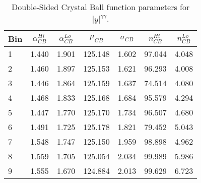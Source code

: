 \begin{table}[h]
\centering
\small
\caption{Double-Sided Crystal Ball function parameters for $|y|^{\gamma\gamma}$.}
\vspace{0.4cm}
\begin{tabular}{l | cccccc}
Bin &  $\alpha_{CB}^{Hi}$ &  $\alpha_{CB}^{Lo}$ &  $\mu_{CB}$ &  $\sigma_{CB}$ &  $n_{CB}^{Hi}$ &  $n_{CB}^{Lo}$ \\
\hline
1   &                     1.440 &                     1.901 &     125.148 &          1.602 &                97.044 &                 4.048 \\
2   &                     1.460 &                     1.897 &     125.153 &          1.621 &                96.293 &                 4.008 \\
3   &                     1.446 &                     1.864 &     125.159 &          1.637 &                74.514 &                 4.080 \\
4   &                     1.468 &                     1.833 &     125.168 &          1.684 &                95.579 &                 4.294 \\
5   &                     1.447 &                     1.770 &     125.170 &          1.734 &                96.507 &                 4.680 \\
6   &                     1.491 &                     1.725 &     125.178 &          1.821 &                79.452 &                 5.043 \\
7   &                     1.548 &                     1.747 &     125.150 &          1.959 &                98.898 &                 4.962 \\
8   &                     1.559 &                     1.705 &     125.054 &          2.034 &                99.989 &                 5.986 \\
9   &                     1.555 &                     1.670 &     124.884 &          2.013 &                99.629 &                 6.723 \\
\end{tabular}
\end{table}


